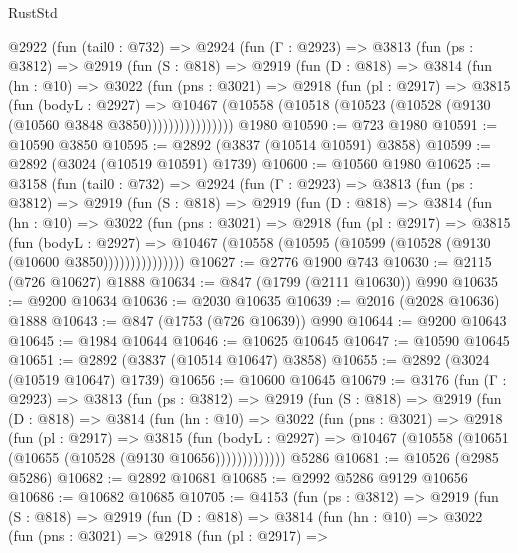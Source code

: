 \begin{lexlean}{RustStd}
\begin{coremodule}
    @2922
      (fun (tail0 : @732) =>
      @2924
        (fun (Γ : @2923) =>
        @3813
          (fun (ps : @3812) =>
          @2919
            (fun (S : @818) =>
            @2919
              (fun (D : @818) =>
              @3814
                (fun (hn : @10) =>
                @3022
                  (fun (pns : @3021) =>
                  @2918
                    (fun (pl : @2917) =>
                    @3815
                      (fun (bodyL : @2927) =>
                      @10467
                        (@10558 (@10518 (@10523 (@10528 (@9130 (@10560 @3848 @3850))))))))))))))))
    @1980
@10590 := @723 @1980
@10591 := @10590 @3850
@10595 := @2892 (@3837 (@10514 @10591) @3858)
@10599 := @2892 (@3024 (@10519 @10591) @1739)
@10600 := @10560 @1980
@10625 := @3158
    (fun (tail0 : @732) =>
    @2924
      (fun (Γ : @2923) =>
      @3813
        (fun (ps : @3812) =>
        @2919
          (fun (S : @818) =>
          @2919
            (fun (D : @818) =>
            @3814
              (fun (hn : @10) =>
              @3022
                (fun (pns : @3021) =>
                @2918
                  (fun (pl : @2917) =>
                  @3815
                    (fun (bodyL : @2927) =>
                    @10467 (@10558 (@10595 (@10599 (@10528 (@9130 (@10600 @3850)))))))))))))))
@10627 := @2776 @1900 @743
@10630 := @2115 (@726 @10627) @1888
@10634 := @847 (@1799 (@2111 @10630)) @990
@10635 := @9200 @10634
@10636 := @2030 @10635
@10639 := @2016 (@2028 @10636) @1888
@10643 := @847 (@1753 (@726 @10639)) @990
@10644 := @9200 @10643
@10645 := @1984 @10644
@10646 := @10625 @10645
@10647 := @10590 @10645
@10651 := @2892 (@3837 (@10514 @10647) @3858)
@10655 := @2892 (@3024 (@10519 @10647) @1739)
@10656 := @10600 @10645
@10679 := @3176
    (fun (Γ : @2923) =>
    @3813
      (fun (ps : @3812) =>
      @2919
        (fun (S : @818) =>
        @2919
          (fun (D : @818) =>
          @3814
            (fun (hn : @10) =>
            @3022
              (fun (pns : @3021) =>
              @2918
                (fun (pl : @2917) =>
                @3815
                  (fun (bodyL : @2927) =>
                  @10467 (@10558 (@10651 (@10655 (@10528 (@9130 @10656)))))))))))))
    @5286
@10681 := @10526 (@2985 @5286)
@10682 := @2892 @10681
@10685 := @2992 @5286 @9129 @10656
@10686 := @10682 @10685
@10705 := @4153
    (fun (ps : @3812) =>
    @2919
      (fun (S : @818) =>
      @2919
        (fun (D : @818) =>
        @3814
          (fun (hn : @10) =>
          @3022
            (fun (pns : @3021) =>
            @2918
              (fun (pl : @2917) =>

\end{coremodule}
\end{lexlean}
